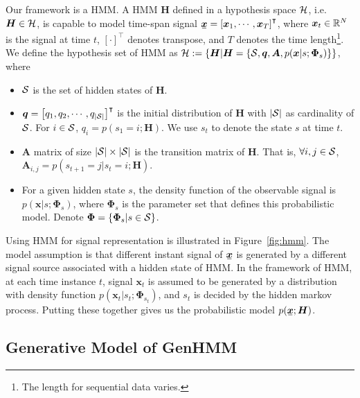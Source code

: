 \documentclass[letterpaper]{article} %
\newcommand{\ubar}[1]{\mkern2mu\underline{\mkern-2mu #1\mkern-2mu}\mkern2mu}
\newcommand{\ubm}[1]{\ubar{\bm{#1}}}
\begin{document}
Our framework is a HMM. A HMM $\bm{H}$ defined in a hypothesis space $\mathcal{H}$, i.e. $\bm{H} \in \mathcal{H}$, is capable to model time-span signal $\ubar{\bm{x}} = \left[ \bm{x}_1, \cdots, \bm{x}_T\right]^{\intercal}$, where $\bm{x}_t\in \mathbb{R}^{N}$ is the signal at time $t$, $[\cdot]^{\intercal}$ denotes transpose, and $T$ denotes the time length\footnote{The length for  sequential data varies.}. We define the hypothesis set of HMM as $\mathcal{H} := \{\bm{H} | \bm{H}=\{\mathcal{S}, \bm{q}, \bm{A}, p(\bm{x}|{s}; \bm{\Phi}_{s})\}\}$, where
\begin{itemize}
\item $\mathcal{S}$ is the set of hidden states of $\bm{H}$.
\item $\bm{q} = \left[ q_1, q_2, \cdots, q_{|\mathcal{S}|}\right]^\intercal$ is the initial distribution of $\bm{H}$ with $|\mathcal{S}|$ as cardinality of $\mathcal{S}$. For $i \in \mathcal{S}$, $q_i = p(s_{1}=i;\bm{H})$. We use $s_t$ to denote the state $s$ at time $t$.
\item $\bm{A}$ matrix of size $|\mathcal{S}| \times |\mathcal{S}|$ is the transition matrix of $\bm{H}$. That is, $\forall i, j \in \mathcal{S}$,  $\bm{A}_{i,j} = p(s_{t+1}=j|s_{t}=i; \bm{H})$.
\item For a given hidden state $s$, the density function of the observable signal is $p({\bm{x}}|{s};\bm{\Phi}_{s})$, where $\bm{\Phi}_{s}$ is the parameter set that defines this probabilistic model. Denote $\bm{\Phi} = \left\{ \bm{\Phi}_{s}| s \in \mathcal{S} \right\}$.
\end{itemize}


Using HMM for signal representation is illustrated in Figure~\ref{fig:hmm}. The model assumption is that different instant signal of $\ubar{\bm{x}}$ is generated by a different signal source associated with a hidden state of HMM.
In the framework of HMM, at each time instance $t$, signal $\bm{x}_t$ is assumed to be generated by a distribution with density function $p(\bm{x}_t| s_t; \bm{\Phi}_{s_t})$, and $s_t$ is decided by the hidden markov process. Putting these together gives us the probabilistic model $p(\ubm{x};\bm{H})$.

\subsection{Generative Model of GenHMM}
\end{document}
